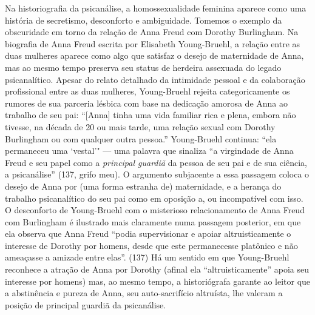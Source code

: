 Na historiografia da psicanálise, a homossexualidade feminina aparece
como uma história de secretismo, desconforto e ambiguidade. Tomemos o
exemplo da obscuridade em torno da relação de Anna Freud com Dorothy
Burlingham. Na biografia de Anna Freud escrita por Elisabeth
Young-Bruehl, a relação entre as duas mulheres aparece como algo que
satisfaz o desejo de maternidade de Anna, mas ao mesmo tempo preserva
seu status de herdeira assexuada do legado psicanalítico. Apesar do
relato detalhado da intimidade pessoal e da colaboração profissional
entre as duas mulheres, Young-Bruehl rejeita categoricamente os rumores
de sua parceria lésbica com base na dedicação amorosa de Anna ao
trabalho de seu pai: ``{[}Anna{]} tinha uma vida familiar rica e plena,
embora não tivesse, na década de 20 ou mais tarde, uma relação sexual
com Dorothy Burlingham ou com qualquer outra pessoa.'' Young-Bruehl
continua: ``ela permaneceu uma `vestal'" --- uma palavra que sinaliza
``a virgindade de Anna Freud e seu papel como a \emph{principal guardiã}
da pessoa de seu pai e de sua ciência, a psicanálise'' (137, grifo meu).
O argumento subjacente a essa passagem coloca o desejo de Anna por (uma
forma estranha de) maternidade, e a herança do trabalho psicanalítico do
seu pai como em oposição a, ou incompatível com isso. O desconforto de
Young-Bruehl com o misterioso relacionamento de Anna Freud com
Burlingham é ilustrado mais claramente numa passagem posterior, em que
ela observa que Anna Freud ``podia supervisionar e apoiar
altruisticamente o interesse de Dorothy por homens, desde que este
permanecesse platônico e não ameaçasse a amizade entre elas''. (137) Há
um sentido em que Young-Bruehl reconhece a atração de Anna por Dorothy
(afinal ela ``altruisticamente'' apoia seu interesse por homens) mas, ao
mesmo tempo, a historiógrafa garante ao leitor que a abstinência e
pureza de Anna, seu auto-sacrifício altruísta, lhe valeram a posição de
principal guardiã da psicanálise.

